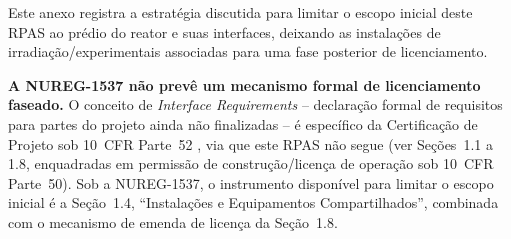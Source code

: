 Este anexo registra a estrat\'egia discutida para limitar o escopo
inicial deste RPAS ao pr\'edio do reator e suas interfaces, deixando as
instala\c{c}\~oes de irradia\c{c}\~ao/experimentais associadas para uma
fase posterior de licenciamento.

\textbf{A NUREG-1537 n\~ao prev\^e um mecanismo formal de licenciamento
faseado.} O conceito de \emph{Interface Requirements} -- declara\c{c}\~ao
formal de requisitos para partes do projeto ainda n\~ao finalizadas -- \'e
espec\'ifico da Certifica\c{c}\~ao de Projeto sob 10~CFR Parte~52
\citep{cfr10p52}, via que este RPAS n\~ao segue (ver Se\c{c}\~oes~1.1 a
1.8, enquadradas em permiss\~ao de constru\c{c}\~ao/licen\c{c}a de
opera\c{c}\~ao sob 10~CFR Parte~50). Sob a NUREG-1537, o instrumento
dispon\'ivel para limitar o escopo inicial \'e a Se\c{c}\~ao~1.4,
``Instala\c{c}\~oes e Equipamentos Compartilhados'', combinada com o
mecanismo de emenda de licen\c{c}a da Se\c{c}\~ao~1.8.

